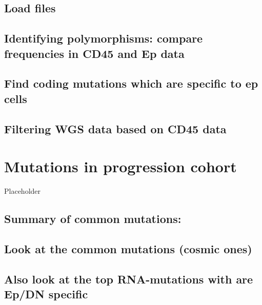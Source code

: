 \documentclass[
]{book}
\begin{document}
\hypertarget{load-files}{%
\section{Load files}\label{load-files}}

\hypertarget{identifying-polymorphisms-compare-frequencies-in-cd45-and-ep-data}{%
\section{Identifying polymorphisms: compare frequencies in CD45 and Ep data}\label{identifying-polymorphisms-compare-frequencies-in-cd45-and-ep-data}}

\hypertarget{find-coding-mutations-which-are-specific-to-ep-cells}{%
\section{Find coding mutations which are specific to ep cells}\label{find-coding-mutations-which-are-specific-to-ep-cells}}

\hypertarget{filtering-wgs-data-based-on-cd45-data}{%
\section{Filtering WGS data based on CD45 data}\label{filtering-wgs-data-based-on-cd45-data}}

\hypertarget{mutations-in-progression-cohort}{%
\chapter{Mutations in progression cohort}\label{mutations-in-progression-cohort}}

Placeholder

\hypertarget{summary-of-common-mutations}{%
\section{Summary of common mutations:}\label{summary-of-common-mutations}}

\hypertarget{look-at-the-common-mutations-cosmic-ones}{%
\section{Look at the common mutations (cosmic ones)}\label{look-at-the-common-mutations-cosmic-ones}}

\hypertarget{also-look-at-the-top-rna-mutations-with-are-epdn-specific}{%
\section{Also look at the top RNA-mutations with are Ep/DN specific}\label{also-look-at-the-top-rna-mutations-with-are-epdn-specific}}
\end{document}
